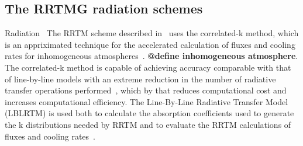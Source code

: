 \subsection{The RRTMG radiation schemes}
Radiation~\citep{Mlawer1997}
The RRTM scheme described in~\citet{Mlawer1997} uses the correlated-k method, which is an appriximated technique for the accelerated calculation of fluxes and cooling rates for inhomogeneous atmospheres~\citep{Mlawer1997}. \textbf{@define inhomogeneous atmosphere}.
The correlated-k method is capable of achieving accuracy comparable with that of line-by-line models with an extreme reduction in the number of radiative transfer operations performed~\citep{Mlawer1997}, which by that reduces computational cost and increases computational efficiency. The Line-By-Line Radiative Transfer Model (LBLRTM) is used both to calculate the absorption coefficients used to generate the k distributions needed by RRTM and  to evaluate the RRTM calculations of fluxes and cooling rates~\citep{Iacono2000}. 


